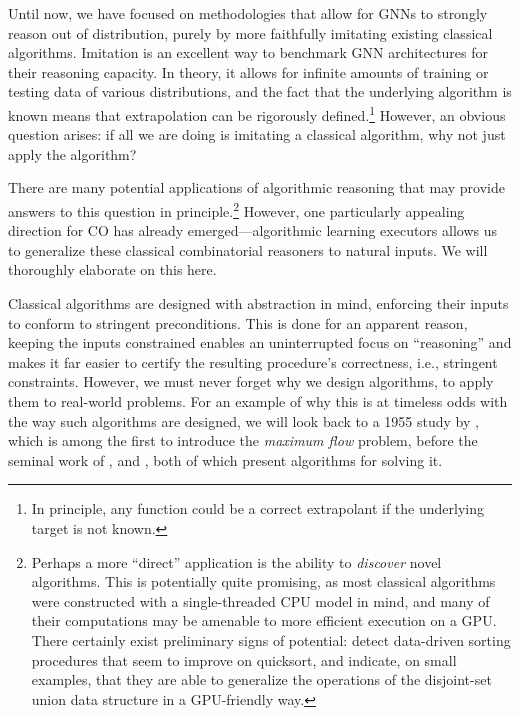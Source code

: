 \documentclass[twoside,11pt]{article}
\begin{document}
Until now, we have focused on methodologies that allow for GNNs to strongly reason out of distribution, purely by more faithfully {imitating} existing classical algorithms. Imitation is an excellent way to {benchmark} GNN architectures for their reasoning capacity. In theory, it allows for {infinite} amounts of training or testing data of various distributions, and the fact that the underlying algorithm is known means that extrapolation can be rigorously defined.\footnote{In principle, {any} function could be a correct extrapolant if the underlying target is not known.} However, an obvious question arises: if all we are doing is imitating a classical algorithm, {why not just apply the algorithm?}

There are many potential applications of algorithmic reasoning that may provide answers to this question in principle.\footnote{Perhaps a more ``direct'' application is the ability to \emph{discover} novel algorithms. This is potentially quite promising, as most classical algorithms were constructed with a single-threaded CPU model in mind, and many of their computations may be amenable to more efficient execution on a GPU. There certainly exist preliminary signs of potential: \citet{li2020strong} detect data-driven sorting procedures that seem to improve on quicksort, and \citet{Velickovic2020} indicate, on small examples, that they are able to generalize the operations of the disjoint-set union data structure in a GPU-friendly way.} However, one particularly appealing direction for CO has already emerged---algorithmic learning executors allows us to generalize these classical combinatorial reasoners to {natural} inputs. We will thoroughly elaborate on this here.

Classical algorithms are designed with {abstraction} in mind, enforcing their inputs to conform to stringent preconditions. This is done for an apparent reason, keeping the inputs constrained enables an uninterrupted focus on ``reasoning'' and makes it far easier to certify the resulting procedure's correctness, i.e., stringent constraints. However, we must never forget why we design algorithms, to apply them to {real-world} problems. For an example of why this is at timeless odds with the way such algorithms are designed, we will look back to a 1955 study by \cite{harris1955fundamentals}, which is among the first to introduce the \emph{maximum flow} problem, before the seminal work of \cite{ford1956maximal}, and \cite{Dinic1970}, both of which present algorithms for solving it.
\end{document}
